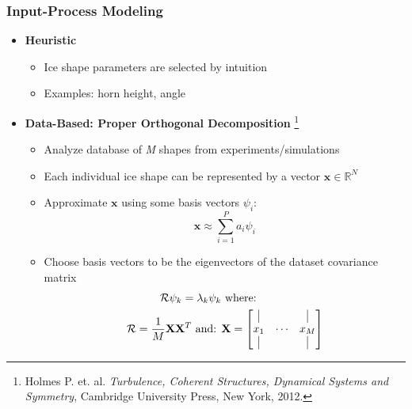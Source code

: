 \documentclass[9pt]{beamer}
\newcommand{\bv}[1]{\mathbf{#1}}
\begin{document}
\begin{frame}
\frametitle{Input-Process Modeling}
\label{sec-1-3}


\begin{itemize}
\item \textbf{Heuristic}
\begin{itemize}
\item Ice shape parameters are selected by intuition
\item Examples: horn height, angle
\end{itemize}
\item \textbf{Data-Based: Proper Orthogonal Decomposition} \footnote{Holmes P. et. al. \emph{Turbulence, Coherent Structures, Dynamical Systems and Symmetry}, Cambridge University Press, New York, 2012.
 }
\begin{itemize}
\item Analyze database of \emph{M} shapes from experiments/simulations
\item Each individual ice shape can be represented by a vector $\bv{x}
    \in \mathbb{R}^N$
\item Approximate $\bv{x}$ using some basis vectors $\psi_i$:
    \begin{equation*}
      \bv{x} \approx \sum_{i=1}^P a_i \psi_i
    \end{equation*}
\item Choose basis vectors to be the eigenvectors of the dataset
    covariance matrix
    \begin{equation*}
    \begin{aligned}
      \mathcal{R} \psi_k = \lambda_k \psi_k& \text{   where:   } \\ 
      \mathcal{R} = \frac{1}{M}\mathbf{X}\mathbf{X}^T \text{   and:   }&
      \mathbf{X} =
       \begin{bmatrix}
        \vline & & \vline \\
        x_1 & \cdots & x_M \\
        \vline & & \vline \\
       \end{bmatrix}
    \end{aligned}
    \end{equation*}
\end{itemize}
\end{itemize}
\end{frame}
\end{document}
